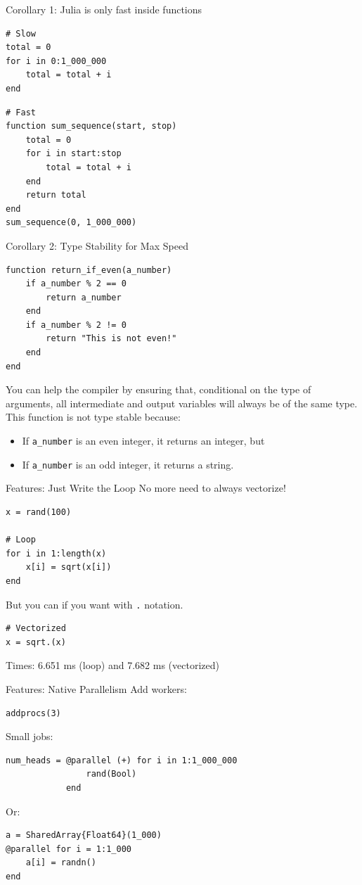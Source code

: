 \documentclass[11pt]{beamer}
\begin{document}
\begin{frame}[fragile]{Corollary 1: Julia is only fast inside functions}
\begin{verbatim}
# Slow
total = 0
for i in 0:1_000_000
    total = total + i
end
\end{verbatim}
\pause
\begin{verbatim}
# Fast
function sum_sequence(start, stop)
    total = 0
    for i in start:stop
        total = total + i
    end
    return total
end
sum_sequence(0, 1_000_000)
\end{verbatim}
\end{frame}


\begin{frame}[fragile]{Corollary 2: Type Stability for Max Speed}

\begin{verbatim}
function return_if_even(a_number)
    if a_number % 2 == 0
        return a_number
    end
    if a_number % 2 != 0
        return "This is not even!"
    end
end
\end{verbatim}
You can help the compiler by ensuring that, \alert{conditional on the type of arguments}, all intermediate and output variables will always be of the same type.\\
\pause This function is \alert{not} type stable because:
\begin{itemize}
    \item If \texttt{a\_number} is an even integer, it returns an integer, but
    \item If \texttt{a\_number} is an odd integer, it returns a string.
\end{itemize}
\end{frame}


\begin{frame}[fragile]{Features: Just Write the Loop}
No more need to always vectorize!
\begin{verbatim}
x = rand(100)

# Loop
for i in 1:length(x)
    x[i] = sqrt(x[i])
end
\end{verbatim}
But you can if you want with \texttt{.} notation.
\begin{verbatim}
# Vectorized
x = sqrt.(x)
\end{verbatim}
Times: 6.651 ms (loop) and 7.682 ms (vectorized)
\end{frame}

\begin{frame}[fragile]{Features: Native Parallelism}
Add workers:
\begin{verbatim}
addprocs(3)
\end{verbatim}
Small jobs:
\begin{verbatim}
num_heads = @parallel (+) for i in 1:1_000_000
                rand(Bool)
            end
\end{verbatim}
\pause
Or:
\begin{verbatim}
a = SharedArray{Float64}(1_000)
@parallel for i = 1:1_000
    a[i] = randn()
end
\end{verbatim}
\end{frame}
\end{document}
